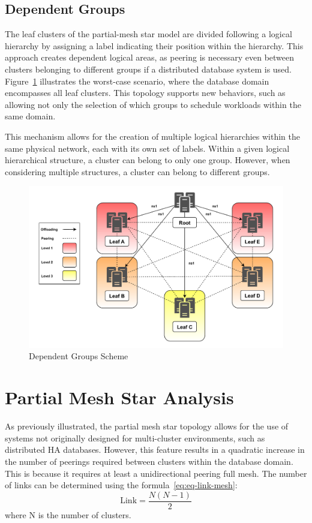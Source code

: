 \subsection{Dependent Groups}
The leaf clusters of the partial-mesh star model are divided following a logical hierarchy by assigning a label indicating their position within the hierarchy. This approach creates dependent logical areas, as peering is necessary even between clusters belonging to different groups if a distributed database system is used. Figure~\ref{fig:group-dep} illustrates the worst-case scenario, where the database domain encompasses all leaf clusters. This topology supports new behaviors, such as allowing not only the selection of which groups to schedule workloads within the same domain.

This mechanism allows for the creation of multiple logical hierarchies within the same physical network, each with its own set of labels. Within a given logical hierarchical structure, a cluster can belong to only one group. However, when considering multiple structures, a cluster can belong to different groups.

\begin{figure}[ht]\centering
\includegraphics[scale=0.7]{Pictures/Level-v4}
\caption{Dependent Groups Scheme}\label{fig:group-dep}
\end{figure}

\section{Partial Mesh Star Analysis}
As previously illustrated, the partial mesh star topology allows for the use of systems not originally designed for multi-cluster environments, such as distributed HA databases. However, this feature results in a quadratic increase in the number of peerings required between clusters within the database domain. This is because it requires at least a unidirectional peering full mesh. The number of links can be determined using the formula~\eqref{eq:eq-link-mesh}:
\begin{equation} \label{eq:eq-link-mesh}
\text{Link} = \frac{N(N-1)}{2}
\end{equation}
where N is the number of clusters.

